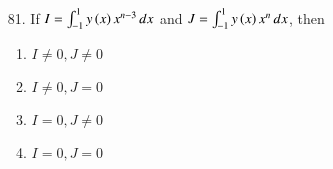 \documentclass[journal,12pt,onecolumn]{IEEEtran}
\theoremstyle{remark}
\begin{document}
\begin{enumerate}
\begin{multicols}{4}
\begin{enumerate}
			\columnbreak
			\item greater than $n + 1$
		\end{enumerate}
	\end{multicols}
\item[81.] If $I = \int_{-1}^{1} y\left(x\right)x^{n-3} \, dx$ and $J = \int_{-1}^{1} y\left(x\right)x^{n} \, dx$, then 
		\hfill{}
        \begin{multicols}{4}
		\begin{enumerate}
			\item $I \ne 0, J \ne 0$ 
			\columnbreak
			\item $I \ne 0, J = 0$
			\columnbreak
			\item $I = 0, J \ne 0$
			\columnbreak
        \item $I = 0, J = 0$
		\end{enumerate}
	\end{multicols}


\end{enumerate}
\end{document}
